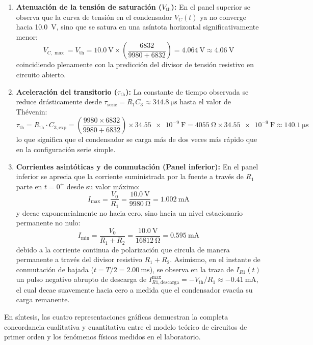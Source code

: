 \begin{enumerate}
    \item \textbf{Atenuación de la tensión de saturación ($V_{\text{th}}$):} En el panel superior se observa que la curva de tensión en el condensador $V_C(t)$ ya no converge hacia \qty{10,0}{\volt}, sino que se satura en una asíntota horizontal significativamente menor:
    \begin{equation*}
        V_{C,\max} = V_{\text{th}} = \qty{10,0}{\volt} \times \left( \frac{6832}{9980 + 6832} \right) = \qty{4,064}{\volt} \approx \qty{4,06}{\volt}
    \end{equation*}
    coincidiendo plenamente con la predicción del divisor de tensión resistivo en circuito abierto.
    \item \textbf{Aceleración del transitorio ($\tau_{\text{th}}$):} La constante de tiempo observada se reduce drásticamente desde $\tau_{\text{serie}} = R_1 C_3 \approx \qty{344,8}{\micro\second}$ hasta el valor de Thévenin:
    \begin{equation*}
        \tau_{\text{th}} = R_{\text{th}} \cdot C_{3,\text{exp}} = \left( \frac{9980 \times 6832}{9980 + 6832} \right) \times \qty{34,55e-9}{\farad} = \qty{4055}{\ohm} \times \qty{34,55e-9}{\farad} \approx \qty{140,1}{\micro\second}
    \end{equation*}
    lo que significa que el condensador se carga más de dos veces más rápido que en la configuración serie simple.
    \item \textbf{Corrientes asintóticas y de conmutación (Panel inferior):} En el panel inferior se aprecia que la corriente suministrada por la fuente a través de $R_1$ parte en $t = 0^+$ desde su valor máximo:
    \begin{equation*}
        I_{\max} = \frac{V_0}{R_1} = \frac{\qty{10,0}{\volt}}{\qty{9980}{\ohm}} = \qty{1,002}{\milli\ampere}
    \end{equation*}
    y decae exponencialmente no hacia cero, sino hacia un nivel estacionario permanente no nulo:
    \begin{equation*}
        I_{\min} = \frac{V_0}{R_1 + R_2} = \frac{\qty{10,0}{\volt}}{\qty{16812}{\ohm}} = \qty{0,595}{\milli\ampere}
    \end{equation*}
    debido a la corriente continua de polarización que circula de manera permanente a través del divisor resistivo $R_1 + R_2$. Asimismo, en el instante de conmutación de bajada ($t = T/2 = \qty{2,00}{\milli\second}$), se observa en la traza de $I_{R1}(t)$ un pulso negativo abrupto de descarga de $I_{R1,\text{descarga}}^{\max} = -V_{\text{th}}/R_1 \approx -\qty{0,41}{\milli\ampere}$, el cual decae suavemente hacia cero a medida que el condensador evacúa su carga remanente.
\end{enumerate}
En síntesis, las cuatro representaciones gráficas demuestran la completa concordancia cualitativa y cuantitativa entre el modelo teórico de circuitos de primer orden y los fenómenos físicos medidos en el laboratorio.
